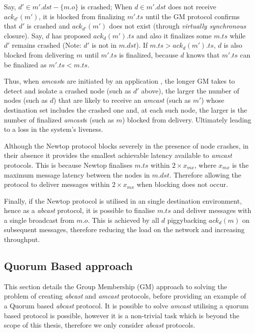         Say, $d' \in m'.dst - \{m.o\}$ is crashed; When $d \in m'.dst$ does not receive $ack_{d'}(m')$, it is blocked from finalizing $m'.ts$ until the GM protocol confirms that $d'$ is crashed and $ack_{d'}(m')$ does not exist (through \emph{virtually synchronous} closure). Say, $d$ has proposed $ack_d(m').ts$ and also it finalizes some $m.ts$ while $d'$ remains crashed (Note: $d'$ is not in $m.dst$). If $m.ts > ack_d(m').ts$, $d$ is also blocked from delivering $m$ until $m'.ts$ is finalized, because $d$ knows that $m'.ts$ can be finalized as $m'.ts < m.ts$.

Thus, when \emph{amcast}s are initiated by an application , the longer GM takes to detect and isolate a crashed node (such as $d'$ above), the larger the number of nodes (such as $d$) that are likely to receive an \emph{amcast} (such as $m'$) whose destination set includes the crashed one and, at each such node, the larger is the number of finalized \emph{amcast}s (such as $m$) blocked from delivery.  Ultimately leading to a loss in the system's liveness.  

Although the Newtop protocol blocks severely in the presence of node crashes, in their absence it provides the smallest achievable latency available to \emph{amcast} protocols.  This is because Newtop finalises $m.ts$ within $2 \times x_{mx}$, where $x_{mx}$ is the maximum message latency between the nodes in $m.dst$.  Therefore allowing the protocol to deliver messages within $2 \times x_{mx}$ when blocking does not occur.  

Finally, if the Newtop protocol is utilised in an single destination environment, hence as a \emph{abcast} protocol, it is possible to finalise $m.ts$ and deliver messages with a single broadcast from $m.o$.  This is achieved by all $d$ piggybacking $ack_d(m)$ on subsequent messages, therefore reducing the load on the network and increasing throughput.  

	\subsection{Quorum Based approach}
	 This section details the Group Membership (GM) approach to solving the problem of creating \emph{abcast} and \emph{amcast} protocols, before providing an example of a Quorum based \emph{abcast} protocol. It is possible to solve \emph{amcast} utilising a quorum based protocol is possible, however it is a non-trivial task which is beyond the scope of this thesis, therefore we only consider \emph{abcast} protocols.  
	 
